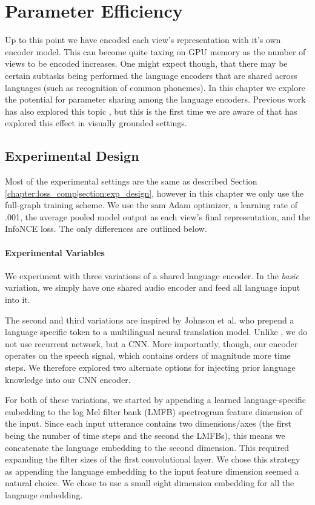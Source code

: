 \chapter{Parameter Efficiency}
\label{chapter:param_eff}
Up to this point we have encoded each view's representation with it's own encoder model.
This can become quite taxing on GPU memory as the number of views to be encoded increases.
One might expect though, that there may be certain subtasks being performed the language encoders that are shared across languages (such as recognition of common phonemes).
In this chapter we explore the potential for parameter sharing among the language encoders.
Previous work has also explored this topic , but this is the first time we are aware of that has explored this effect in visually grounded settings.

\section{Experimental Design}
\label{chapter:param_eff|section:exp_design}
Most of the experimental settings are the same as described Section \ref{chapter:loss_comp|section:exp_design}, however in this chapter we only use the full-graph training scheme.
We use the sam Adam optimizer, a learning rate of .001, the average pooled model output as each view's final representation, and the InfoNCE loss.
The only differences are outlined below.
\subsubsection{Experimental Variables}
\label{chapter:param_eff|section:exp_variables}
We experiment with three variations of a shared language encoder. 
In the \textit{basic} variation, we simply have one shared audio encoder and feed all language input into it.

The second and third variations are inspired by Johnson et al. \cite{johnson2017google} who prepend a language specific token to a multilingual neural translation model.
Unlike \cite{johnson2017google}, we do not use recurrent network, but a CNN. 
More importantly, though, our encoder operates on the speech signal, which contains orders of magnitude more time steps.
We therefore explored two alternate options for injecting prior language knowledge into our CNN encoder.


For both of these variations, we started by appending a learned language-specific embedding to the log Mel filter bank  (LMFB) spectrogram feature dimension of the input.
Since each input utterance contains two dimensions/axes (the first being the number of time steps and the second the LMFBs), this means we concatenate the language embedding to the second dimension.
This required expanding the filter sizes of the first convolutional layer.
We chose this strategy as appending the language embedding to the input feature dimension seemed a natural choice.
We chose to use a small eight dimension embedding for all the langauge embedding.

